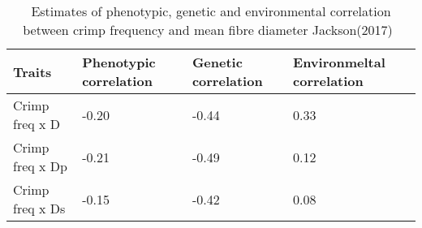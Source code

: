 %

\begin{table}[htp]
\centering
\caption{Estimates of phenotypic, genetic and environmental correlation between crimp frequency  and mean fibre diameter Jackson(2017)~\cite{jackson-2017a}}
\label{tab:fcd}
\vspace{0.1in}
\begin{tabular}{|p{2.0in}|p{1.0in}|p{1.0in}|p{1.0in}|}  \hline
 Traits  & Phenotypic correlation  &  Genetic correlation & Environmeltal correlation  \\ 
\hline 
Crimp freq x D & -0.20 & -0.44 & 0.33 \\
Crimp freq x Dp   & -0.21 & -0.49 & 0.12 \\
Crimp freq x Ds  &  -0.15 & -0.42 & 0.08 \\
\hline

\end{tabular}
\end{table}

%
